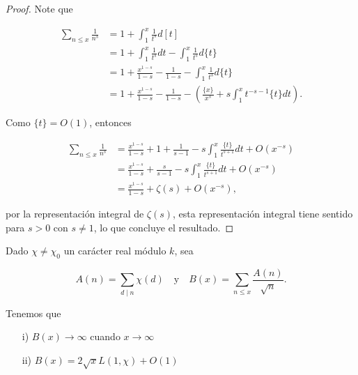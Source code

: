 \begin{proof}
Note que 

\begin{align*}
    \sum_{n\leq x}\frac{1}{n^s}&=1+\int_1^x\frac{1}{t^s}d[t]\\
    &=1+\int_1^x\frac{1}{t^s}dt-\int_1^x\frac{1}{t^s}d\{t\}\\
    &=1+\frac{x^{1-s}}{1-s}-\frac{1}{1-s}-\int_1^x\frac{1}{t^s}d\{t\}\\
    &=1+\frac{x^{1-s}}{1-s}-\frac{1}{1-s}-\left(\frac{\{x\}}{x^s}+s\int_1^xt^{-s-1}\{t\}dt\right)  
.\end{align*}

Como $\{t\}=O(1)$, entonces 

\begin{align*}
    \sum_{n\leq x}\frac{1}{n^s}&=\frac{x^{1-s}}{1-s}+1+\frac{1}{s-1}-s\int_1^x\frac{\{t\}}{t^{s+1}}dt+O(x^{-s})\\
    &=\frac{x^{1-s}}{1-s}+\frac{s}{s-1}-s\int_1^x \frac{\{t\}}{t^{s+1}}dt+O(x^{-s})\\
    &=\frac{x^{1-s}}{1-s}+\zeta(s)+O(x^{-s})
,\end{align*}

por la representación integral de $\zeta(s)$, esta representación integral tiene sentido para $s>0$ con $s\neq 1$, lo que concluye el resultado.
\end{proof}


\begin{theorem}
Dado $\chi\neq\chi_0$ un carácter real módulo $k$, sea

$$A(n)=\sum_{d\mid n}\chi(d)\quad \text{y} \quad B(x)=\sum_{n\leq x}\frac{A(n)}{\sqrt{n}}.$$

Tenemos que

\begin{itemize}
\item[i)] $B(x)\to\infty$ cuando $x\to\infty$

\item[ii)] $B(x)=2 \sqrt{x} L(1,\chi)+O(1)$
\end{itemize}
\end{theorem}

